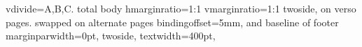 {{%
vdivide={A,B,C}.
total body
hmarginratio=1:1
vmarginratio=1:1
twoside, %
on verso pages.
swapped on alternate pages
bindingoffset=5mm, %
and baseline of footer
marginparwidth=0pt, %
twoside,
textwidth=400pt, %
}
} %


